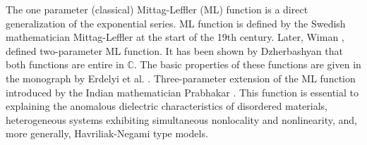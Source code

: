 \documentclass[a4paper,12pt]{article}
\theoremstyle{remark}
\begin{document}
\noindent The one parameter (classical)  Mittag-Leffler (ML) function %
is a direct generalization of the exponential series.  ML function is  defined by the Swedish mathematician Mittag-Leffler \cite{mittag1905,mittag1903nouvelle} at the start of the 19th century.	
	 Later, Wiman \cite{wiman1905}, defined two-parameter ML function. %
      It has been shown by Dzherbashyan \cite{dzherbashyan1966} that both functions are entire in $\mathbb{C}$.
	The basic properties of these functions are given in the monograph by Erdelyi et al. \cite{erdelyi1955}. %
	Three-parameter extension of the ML function introduced by the Indian mathematician  Prabhakar \cite{prabhakar1971}. 
    This function is essential to explaining the anomalous dielectric characteristics of disordered materials, heterogeneous systems exhibiting simultaneous nonlocality and nonlinearity, and, more generally, Havriliak-Negami type models.
\end{document}
